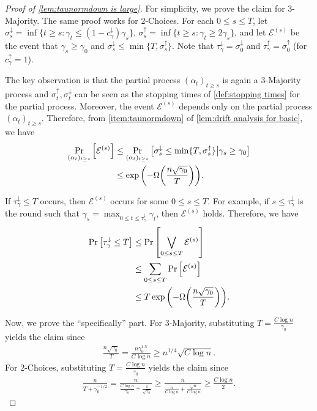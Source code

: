 \documentclass[letterpaper,11pt]{article}
\newcommand{\alphanorm}{\gamma}
\newcommand{\taunormup}{\tau^{\uparrow}_\alphanorm}
\newcommand{\taunormdown}{\tau^{\downarrow}_\alphanorm}
\newcommand{\calE}{\mathcal{E}}
\newcommand{\cnormup}{c^{\uparrow}_\alphanorm}
\newcommand{\cnormdown}{c^{\downarrow}_\alphanorm}
\begin{document}
\begin{proof}[Proof of \cref{lem:taunormdown is large}]
  For simplicity, we prove the claim for 3-Majority.
  The same proof works for 2-Choices.
    For each $0\le s \le T$,
    let $\sigma^{\downarrow}_s = \inf\{ t\ge s \colon \alphanorm_t \le (1-\cnormdown) \alphanorm_s \}$,
    $\sigma^{\uparrow}_s = \inf\{t \ge s \colon \alphanorm_t \ge 2\alphanorm_s\}$,
    and
    let $\calE^{(s)}$ be the event that $\alphanorm_s \ge \alphanorm_0$ and $\sigma^{\downarrow}_s \le \min\{T, \sigma^{\uparrow}_s\}$.
    Note that $\taunormdown = \sigma^{\downarrow}_0$ and $\taunormup = \sigma^{\uparrow}_0$ (for $\cnormup=1$).

    The key observation is that the partial process $(\alpha_t)_{t\ge s}$ is again a 3-Majority process and $\sigma_t^{\uparrow},\sigma_t^{\downarrow}$ can be seen as the stopping times of \cref{def:stopping times} for the partial process.
    Moreover, the event $\calE^{(s)}$ depends only on the partial process $(\alpha_t)_{t\ge s}$.
    Therefore, from \cref{item:taunormdown} of \cref{lem:drift analysis for basic}, we have
    \begin{align*}
        \Pr_{(\alpha_t)_{t\ge s}}\qty[ \calE^{(s)} ] &\le \Pr_{(\alpha_t)_{t\ge s}}\qty[ \sigma_s^{\downarrow} \le \min\{T, \sigma^{\uparrow}_s\} \middle| \alphanorm_s \ge \alphanorm_0 ] \\
        &\le \exp\qty( - \Omega\qty( \frac{n\sqrt{\alphanorm_0}}{T})).
    \end{align*}

    If $\taunormdown \le T$ occurs, then $\calE^{(s)}$ occurs for some $0\le s \le T$.
    For example, if $s\le \taunormdown$ is the round such that $\alphanorm_s = \max_{0\le t \le \taunormdown} \alphanorm_t$, then $\calE^{(s)}$ holds.
    Therefore, we have
    \begin{align*}
        \Pr\qty[ \taunormdown \le T ] &\le \Pr\qty[ \bigvee_{0\le s \le T} \calE^{(s)} ] \\
        &\le \sum_{0\le s \le T} \Pr\qty[ \calE^{(s)}] \\
        &\le T\exp\qty( - \Omega\qty( \frac{n\sqrt{\alphanorm_0}}{T} )).
    \end{align*}    

    Now, we prove the ``specifically'' part.
    For 3-Majority, substituting $T=\frac{C\log n}{\alphanorm_0}$ yields the claim since
    \begin{align*}
    \frac{n\sqrt{\alphanorm_0}}{T}
    =\frac{n\alphanorm_0^{1.5}}{C\log n}
    \geq  n^{1/4}\sqrt{C \log n}.
    \end{align*}
    For 2-Choices, substituting  $T=\frac{C\log n}{\alphanorm_0}$ yields the claim since
    \begin{align*}
    \frac{n}{T+\alphanorm_0^{-1/2}}
    = \frac{n}{\frac{C\log n}{\alphanorm_0}+\frac{1}{\sqrt{\alphanorm_0}}}
    \geq \frac{n}{\frac{n}{C\log n}+\frac{\sqrt{n}}{C\log n}}
    \geq \frac{C\log n}{2}.
    \end{align*}
\end{proof}
\end{document}

